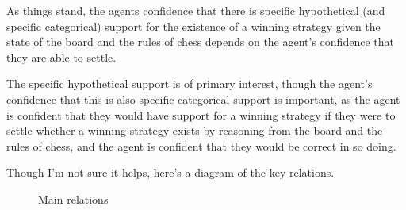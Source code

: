 \documentclass[10pt]{article}
\begin{document}
As things stand, the agents confidence that there is specific hypothetical (and specific categorical) support for the existence of a winning strategy given the state of the board and the rules of chess depends on the agent's confidence that they are able to settle.

The specific hypothetical support is of primary interest, though the agent's confidence that this is also specific categorical support is important, as the agent is confident that they would have support for a winning strategy if they were to settle whether a winning strategy exists by reasoning from the board and the rules of chess, and the agent is confident that they would be correct in so doing.

Though I'm not sure it helps, here's a diagram of the key relations.

\begin{figure}[h]
  \centering
\caption{Main relations}
\label{fig:dynamics}
\end{figure}
\end{document}
